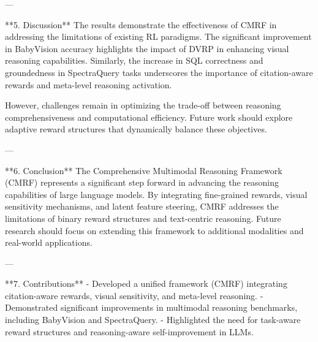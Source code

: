---

**5. Discussion**  
The results demonstrate the effectiveness of CMRF in addressing the limitations of existing RL paradigms. The significant improvement in BabyVision accuracy highlights the impact of DVRP in enhancing visual reasoning capabilities. Similarly, the increase in SQL correctness and groundedness in SpectraQuery tasks underscores the importance of citation-aware rewards and meta-level reasoning activation.  

However, challenges remain in optimizing the trade-off between reasoning comprehensiveness and computational efficiency. Future work should explore adaptive reward structures that dynamically balance these objectives.  

---

**6. Conclusion**  
The Comprehensive Multimodal Reasoning Framework (CMRF) represents a significant step forward in advancing the reasoning capabilities of large language models. By integrating fine-grained rewards, visual sensitivity mechanisms, and latent feature steering, CMRF addresses the limitations of binary reward structures and text-centric reasoning. Future research should focus on extending this framework to additional modalities and real-world applications.  

---

**7. Contributions**  
- Developed a unified framework (CMRF) integrating citation-aware rewards, visual sensitivity, and meta-level reasoning.  
- Demonstrated significant improvements in multimodal reasoning benchmarks, including BabyVision and SpectraQuery.  
- Highlighted the need for task-aware reward structures and reasoning-aware self-improvement in LLMs.  